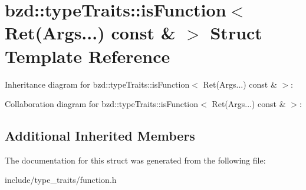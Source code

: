 \hypertarget{structbzd_1_1typeTraits_1_1isFunction_3_01Ret_07Args_8_8_8_08_01const_01_6_01_4}{}\section{bzd\+:\+:type\+Traits\+:\+:is\+Function$<$ Ret(Args...) const \& $>$ Struct Template Reference}
\label{structbzd_1_1typeTraits_1_1isFunction_3_01Ret_07Args_8_8_8_08_01const_01_6_01_4}


Inheritance diagram for bzd\+:\+:type\+Traits\+:\+:is\+Function$<$ Ret(Args...) const \& $>$\+:


Collaboration diagram for bzd\+:\+:type\+Traits\+:\+:is\+Function$<$ Ret(Args...) const \& $>$\+:
\subsection*{Additional Inherited Members}


The documentation for this struct was generated from the following file\+:\begin{DoxyCompactItemize}
\item 
include/type\+\_\+traits/function.\+h\end{DoxyCompactItemize}
